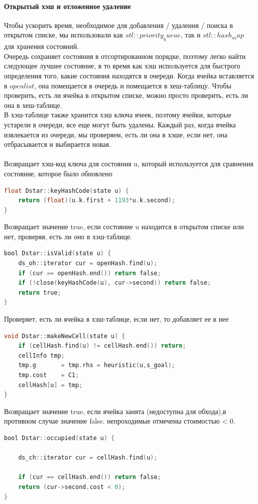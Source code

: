 \documentclass[12pt]{article}
\begin{document}
\paragraph{Открытый хэш и отложенное удаление}
Чтобы ускорить время, необходимое для добавления / удаления / поиска в открытом списке, мы использовали как $stl::priority_queue$, так и $stl ::hash_map$ для хранения состояний.\\Очередь сохраняет состояния в отсортированном порядке, поэтому легко найти следующее лучшее состояние, в то время как хэш используется для быстрого определения того, какие состояния находятся в очереди. Когда ячейка вставляется в $openlist$, она помещается в очередь и помещается в хеш-таблицу. Чтобы проверить, есть ли ячейка в открытом списке, можно просто проверить, есть ли она в хеш-таблице. \\В хэш-таблице также хранится хэш ключа ячеек, поэтому ячейки, которые устарели в очереди, все еще могут быть удалены. Каждый раз, когда ячейка извлекается из очереди, мы проверяем, есть ли она в хэше, если нет, она отбрасывается и выбирается новая.
\\
\\
Возвращает хэш-код ключа для состояния u, который используется для сравнения состояние, которое было обновлено
\begin{lstlisting}[language=C,style=C]
float Dstar::keyHashCode(state u) {
    return (float)(u.k.first + 1193*u.k.second);
}
\end{lstlisting}

Возвращает значение true, если состояние u находится в открытом списке или нет,
проверяя, есть ли оно в хэш-таблице.
\begin{lstlisting}[language=C,style=C]
bool Dstar::isValid(state u) {
    ds_oh::iterator cur = openHash.find(u);
    if (cur == openHash.end()) return false;
    if (!close(keyHashCode(u), cur->second)) return false;
    return true;
}
\end{lstlisting}

Проверяет, есть ли ячейка в хэш-таблице, если нет, то добавляет ее в нее
\begin{lstlisting}[language=C,style=C]
void Dstar::makeNewCell(state u) {
    if (cellHash.find(u) != cellHash.end()) return;
    cellInfo tmp;
    tmp.g       = tmp.rhs = heuristic(u,s_goal);
    tmp.cost    = C1;
    cellHash[u] = tmp;
}
\end{lstlisting}
Возвращает значение true, если ячейка занята (недоступна для обхода),в противном случае значение false. непроходимые отмечены стоимостью < 0.
\begin{lstlisting}[language=C,style=C]
bool Dstar::occupied(state u) {

    ds_ch::iterator cur = cellHash.find(u);

    if (cur == cellHash.end()) return false;
    return (cur->second.cost < 0);
}
\end{lstlisting}
\end{document}

